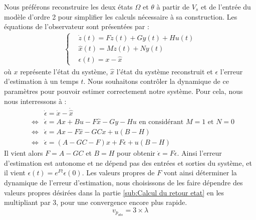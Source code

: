 Nous préférons reconstruire les deux états $\Omega$ et $\theta$ à partir de $V_s$ et de l'entrée du modèle d'ordre 2 pour simplifier les calculs nécessaire à sa construction. Les équations de l'observateur sont présentées par :
\begin{align*}
\left\lbrace
\begin{aligned}
&\dot z (t) = Fz(t) + Gy(t) + Hu(t)\\
&\hat x (t)= Mz(t) + Ny(t)\\
&\epsilon (t)= x-\hat{x}
\end{aligned}
\right.
\end{align*}
 où $x$ représente l'état du système, $\hat{x}$ l'état du système reconstruit et $\epsilon$ l'erreur d'estimation à un temps $t$. Nous souhaitons contrôler la dynamique de ce paramètres pour pouvoir estimer correctement notre système. Pour cela, nous nous interressons à : 
\begin{eqnarray}
&&\dot{\epsilon} = \dot{x} - \dot{\hat{x}}\\
\label{equ:obs2}&\Leftrightarrow & \dot{\epsilon} = Ax +Bu - F\hat{x} - Gy - Hu \text{   en considérant }M=1 \text{ et } N = 0\\
& \Leftrightarrow & \dot{\epsilon} = Ax - F\hat{x} - GCx + u(B-H)\\
& \Leftrightarrow & \dot{\epsilon} = (A-GC-F)x + F\epsilon + u(B-H)
\end{eqnarray}
Il vient alors $F = A-GC$ et $B=H$ pour obtenir $\dot{\epsilon} = F\epsilon$. Ainsi l'erreur d'estimation est autonome et ne dépend pas des entrées et sorties du système, et il vient $\epsilon(t) = e^{Ft}\epsilon(0)$. Les valeurs propres de $F$ vont ainsi déterminer la dynamique de l'erreur d'estimation, nous choisissons de les faire dépendre des valeurs propres désirées dans la partie \ref{sub:Calcul du retour etat} en les multipliant par 3, pour une convergence encore plus rapide. 
\begin{equation}\label{eqn:vpObservateur}
v_{p_{obs}} = 3\times \lambda
\end{equation}


